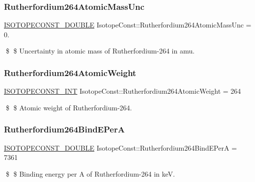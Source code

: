 \subsubsection{\texorpdfstring{Rutherfordium264\+Atomic\+Mass\+Unc}{Rutherfordium264AtomicMassUnc}}
{\footnotesize\ttfamily \mbox{\hyperlink{group___isotope_const-_macros_ga8f45a7272ce02c0b4c65c44636ed719a}{I\+S\+O\+T\+O\+P\+E\+C\+O\+N\+S\+T\+\_\+\+D\+O\+U\+B\+LE}} Isotope\+Const\+::\+Rutherfordium264\+Atomic\+Mass\+Unc = 0.}

\$ \$ Uncertainty in atomic mass of Rutherfordium-\/264 in amu. \mbox{\label{group___isotope_const-_rutherfordium-_rf264_ga888ae461a514eb49b41eec2f83bcde93}} 
\subsubsection{\texorpdfstring{Rutherfordium264\+Atomic\+Weight}{Rutherfordium264AtomicWeight}}
{\footnotesize\ttfamily \mbox{\hyperlink{group___isotope_const-_macros_ga5f18360b3e99483a35c32d789e62621c}{I\+S\+O\+T\+O\+P\+E\+C\+O\+N\+S\+T\+\_\+\+I\+NT}} Isotope\+Const\+::\+Rutherfordium264\+Atomic\+Weight = 264}

\$ \$ Atomic weight of Rutherfordium-\/264. \mbox{\label{group___isotope_const-_rutherfordium-_rf264_ga947fac34f75eb6d97ec6b36886ec6fcb}} 
\subsubsection{\texorpdfstring{Rutherfordium264\+Bind\+E\+PerA}{Rutherfordium264BindEPerA}}
{\footnotesize\ttfamily \mbox{\hyperlink{group___isotope_const-_macros_ga8f45a7272ce02c0b4c65c44636ed719a}{I\+S\+O\+T\+O\+P\+E\+C\+O\+N\+S\+T\+\_\+\+D\+O\+U\+B\+LE}} Isotope\+Const\+::\+Rutherfordium264\+Bind\+E\+PerA = 7361}

\$ \$ Binding energy per A of Rutherfordium-\/264 in keV. \mbox{\label{group___isotope_const-_rutherfordium-_rf264_ga3f87585d69f0abb01a8eae8e1b745e25}} 
